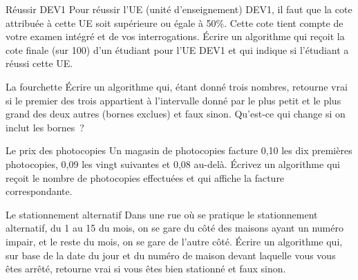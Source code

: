 	\begin{Exercice}{Réussir DEV1}
		Pour réussir l’UE (unité d’enseignement) DEV1,
		il faut que la cote attribuée à cette UE 
		soit supérieure ou égale à 50\%.
		Cette cote tient compte de votre examen intégré
		et de vos interrogations.
		Écrire un algorithme 
		qui reçoit la cote finale (sur 100)
		d’un étudiant pour l’UE DEV1
		et qui indique si l’étudiant a réussi cette UE.
	\end{Exercice}	
		
\begin{comment}
	\begin{Exercice}{Réussir GEN1}
		\marginicon{java}
		\label{algo:réussirGEN1}
		l'UE (Unité d'enseignement) GEN1 est composée de trois AA (activité d’apprentissage) :
		Mathématique, Communication anglophone et Comptabilité%
		\footnote{%
			Sans parler de Méthodologie qui ne donne pas lieu à une évaluation.
		}.
		Pour réussir cette unité d’enseignement,
		il faut que la cote attribuée à chaque AA soit supérieure ou égale à 50\%.
		Si c'est le cas, la cote attribuée à l'UE est une moyenne \textbf{pondérée}
		des trois cotes d'AA 
		(avec la pondération 6 pour Mathématique et 2 pour les autres AA).
		
		Écrire un algorithme qui reçoit les 3 cotes (sur 20) d’AA d’un étudiant
		pour l’UE GEN1 et qui \textbf{affiche} un message
		indiquant si l’étudiant a réussi ou pas cette UE.
		S’il a réussi, l’algorithme affiche également la cote d'UE (sur 20).
	\end{Exercice}		
\end{comment}

	\begin{Exercice}{La fourchette}
		Écrire un algorithme qui, étant donné trois nombres, 
		retourne vrai si le premier des trois 
		appartient à l’intervalle donné par le plus petit et le plus grand 
		des deux autres (bornes exclues) et faux sinon. 
		Qu’est-ce qui change si on inclut les bornes~?
	\end{Exercice}

	\begin{Exercice}{Le prix des photocopies}
		Un magasin de photocopies facture 0,10 \texteuro{} 
		les dix premières photocopies, 
		0,09 \texteuro{} les vingt suivantes 
		et 0,08 \texteuro{} au-delà. 
		Écrivez un algorithme 
		qui reçoit le nombre de photocopies effectuées 
		et qui affiche la facture correspondante.
	\end{Exercice}

	\begin{Exercice}{Le stationnement alternatif}
		Dans une rue où se pratique le stationnement alternatif, 
		du 1 au 15 du mois, on se gare du côté des maisons ayant un numéro impair, 
		et le reste du mois, on se gare de l’autre côté. 
		Écrire un algorithme qui, sur base de la date du jour et du numéro de maison
		devant laquelle vous vous êtes arrêté, 
		retourne vrai si vous êtes bien stationné et faux sinon.
	\end{Exercice}

